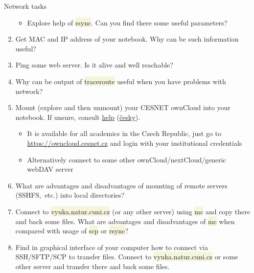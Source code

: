 \documentclass[compress, xelatex, 11pt, xcolor=svgnames, aspectratio=169,
	hyperref={
		bookmarks=true,
		unicode=true,
		colorlinks=true,
		pdftitle={Linux, command line and MetaCentrum},
		plainpages=false,
		pdfauthor={Vojtech Zeisek},
		pdfsubject={Course about use of Linux command line, writing shell scripts and using MetaCentrum of CESNET},
		pdfcreator={XeLaTeX},
		pdfkeywords={Linux, GNU, BASH, shell, command line, MetaCentrum},
		linkcolor=DarkRed, %
		anchorcolor=DarkBlue, %
		citecolor=Indigo, %
		filecolor=NavyBlue, %
		menucolor=DarkMagenta, %
		urlcolor=DarkBlue, %
		},
	url={hyphens, lowtilde} %
	]{beamer}
\renewcommand{\texttt}[1]{\colorbox{Beige}{{\ttfamily #1}}}
\begin{document}
\begin{frame}[allowframebreaks]{Network tasks}
\begin{enumerate}
\begin{itemize}
			\item Explore help of \texttt{rsync}. Can you find there some useful parameters?
		\end{itemize}
		\item Get MAC and IP address of your notebook. Why can be such information useful?
		\item Ping some web server. Is it alive and well reachable?
		\item Why can be output of \texttt{traceroute} useful when you have problems with network?
		\item Mount (explore and then unmount) your CESNET ownCloud into your notebook. If unsure, consult \href{https://du.cesnet.cz/en/navody/owncloud/start}{help} (\href{https://du.cesnet.cz/cs/navody/owncloud/start}{česky}).
		\begin{itemize}
			\item It is available for all academics in the Czech Republic, just go to \url{https://owncloud.cesnet.cz} and login with your institutional credentials
			\item Alternatively connect to some other ownCloud/nextCloud/generic webDAV server
		\end{itemize}
		\item What are advantages and disadvantages of mounting of remote servers (SSHFS,~etc.) into local directories?
		\item Connect to \texttt{vyuka.natur.cuni.cz} (or any other server) using \texttt{mc} and copy there and back some files. What are advantages and disadvantages of \texttt{mc} when compared with usage of \texttt{scp} or \texttt{rsync}?
		\item Find in graphical interface of your computer how to connect via SSH/SFTP/SCP to transfer files. Connect to \texttt{vyuka.natur.cuni.cz} or some other server and transfer there and back some files.
	\end{enumerate}
\end{frame}
\end{document}
